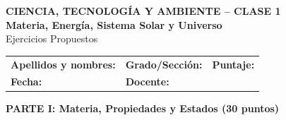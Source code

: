 \documentclass[10pt]{article}
\newcommand{\parte}[2]{%
  \begin{tcolorbox}[colback=#1, colframe=#1, arc=4pt,
    left=8pt, right=8pt, top=3pt, bottom=3pt,
    before skip=14pt, after skip=6pt]
    \textbf{\color{white}\large #2}
  \end{tcolorbox}%
}
\begin{document}

\begin{tcolorbox}[colback=azulclaro, colframe=azulprim, arc=4pt]
  \begin{center}
    {\large\bfseries\color{azulprim} CIENCIA, TECNOLOGÍA Y AMBIENTE -- CLASE 1}\\[3pt]
    {\normalsize\bfseries Materia, Energía, Sistema Solar y Universo}\\[3pt]
    {\small Ejercicios Propuestos}
  \end{center}
  \vspace{4pt}
  \begin{tabular*}{\linewidth}{@{}p{5.5cm}p{6.5cm}p{3cm}@{}}
    \textbf{Apellidos y nombres:} \underline{\hspace{4.5cm}} &
    \textbf{Grado/Sección:} \underline{\hspace{2cm}} &
    \textbf{Puntaje:} \underline{\hspace{1.8cm}} \\[6pt]
    \textbf{Fecha:} \underline{\hspace{4.8cm}} &
    \textbf{Docente:} \underline{\hspace{3cm}} & \\
  \end{tabular*}
\end{tcolorbox}

\vspace{0.2cm}

\parte{azulprim}{PARTE I: Materia, Propiedades y Estados (30 puntos)}
\end{document}
